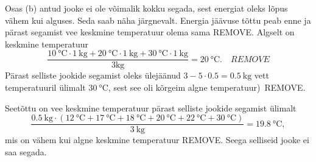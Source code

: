 \documentclass[10pt]{article}
\newcommand{\pp}[1]{REMOVE}
\begin{document}
Osas (b) antud jooke ei ole võimalik kokku segada, sest energiat oleks lõpus vähem kui alguses. Seda saab näha järgnevalt. Energia jäävuse tõttu peab enne ja pärast segamist vee keskmine temperatuur olema sama \pp{1}. Algselt on keskmine temperatuur $$\frac{\SI{10}{\celsius} \cdot \SI{1}{\kg} +\SI{20}{\celsius} \cdot \SI{1}{\kg}+\SI{30}{\celsius} \cdot \SI{1}{\kg}}{3\text{kg}}=\SI{20}{\celsius}.  \quad \pp{1}$$
Pärast selliste jookide segamist oleks ülejäänud $3-5\cdot 0.5=\SI{0.5}{\kilo\gram}$ vett temperatuuril ülimalt $\SI{30}{\celsius}$, sest see oli kõrgeim algne temperatuur)~\pp{1}. \par
Seetõttu on vee keskmine temperatuur pärast selliste jookide segamist ülimalt
$$\frac{\SI{0.5}{\kg}\cdot(\SI{12}{\celsius} +\SI{17}{\celsius} +\SI{18}{\celsius}+\SI{20}{\celsius} +\SI{22}{\celsius}+\SI{30}{\celsius})}{\SI{3}{\kg}}=\SI{19.8}{\celsius},$$
mis on vähem kui algne keskmine temperatuur \pp1. Seega selliseid jooke ei saa segada.
\probend
\bigskip

\end{document}
